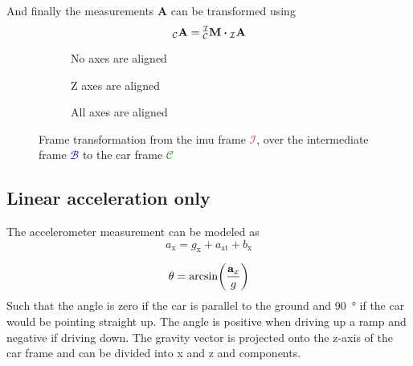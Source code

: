 And finally the measurements $\mathbf{A}$ can be transformed using
\begin{equation}
    \vincs{A}{c} = \mtf{i}{c} \vdot \vincs{A}{i}
\end{equation}
\begin{figure}[htb]
    \centering
    \begin{subfigure}[b]{0.3\textwidth}
        \centering
        
        \caption{No axes are aligned}
        \label{fig:tikz_frame_transformation_init}
    \end{subfigure}
    \hfill
    \begin{subfigure}[b]{0.3\textwidth}
        \centering
        
        \caption{Z axes are aligned}
        \label{fig:tikz_frame_transformation_intermediate}
    \end{subfigure}
    \hfill
    \begin{subfigure}[b]{0.3\textwidth}
        \centering
        
        \caption{All axes are aligned}
        \label{fig:tikz_frame_transformation_final}
    \end{subfigure}
    \caption[Frame transformation]{Frame transformation from the \gls{imu} frame \textcolor{red}{$\mathcal{I}$}, over the intermediate frame \textcolor{blue}{$\mathcal{B}$} to the car frame \textcolor{green}{$\mathcal{C}$}}
    \label{fig:tikz_frame_transformation}
\end{figure}


\subsection{Linear acceleration only}
The accelerometer measurement can be modeled as
\begin{equation}
    a_\mathrm{x} = g_\mathrm{x} + a_\mathrm{at} + b_\mathrm{x}
\end{equation}

\begin{equation}
    \theta = \arcsin(\frac{\vb{a}_x}{g})
\end{equation}
Such that the angle is zero if the car is parallel to the ground and \SI{90}{\degree} if the car would be pointing straight up.
The angle is positive when driving up a ramp and negative if driving down.
The gravity vector is projected onto the z-axis of the car frame and can be divided into x and z and components.

